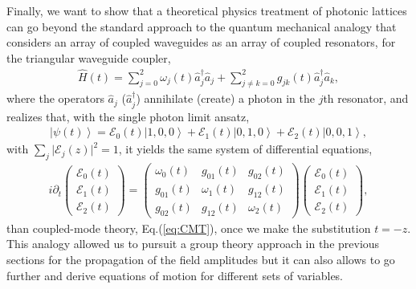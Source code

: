 \documentclass[9pt,twocolumn,twoside]{osajnl}
\begin{document}
Finally, we want to show that a theoretical physics treatment of photonic lattices can go beyond the standard approach to the quantum mechanical analogy that considers an array of coupled waveguides as an array of coupled resonators, for the triangular waveguide coupler,
\begin{eqnarray}\label{eq:qmHamiltonian}
	\hat{H}(t) = \sum_{j=0}^{2} \omega_j(t) \hat{a}^{\dagger}_j \hat{a}_{j} + \sum_{j\neq k=0}^{2} g_{jk}(t) \hat{a}^{\dagger}_j \hat{a}_k,
\end{eqnarray}
where the operators $\hat{a}_{j}$ ($\hat{a}_{j}^{\dagger}$) annihilate (create) a photon in the $j$th resonator, and realizes that, with the single photon limit ansatz,
\begin{eqnarray}\label{eq:sglPhoton}
	\left\vert \psi(t) \right\rangle = \mathcal{E}_{0}(t) \left\vert 1, 0, 0 \right\rangle  +
	\mathcal{E}_{1}(t) \left\vert 0,1,0 \right\rangle + \mathcal{E}_{2}(t) \left\vert 0,0,1 \right\rangle,
\end{eqnarray}
with $ \sum_{j} \vert \mathcal{E}_{j}(z) \vert^2 = 1$, it yields the same system of differential equations,
\begin{eqnarray} \label{eq:}
	i \partial_t	
	\left( \begin{array}{c} 
		\mathcal{E}_{0}(t) \\
		\mathcal{E}_{1}(t) \\
		\mathcal{E}_{2}(t)
	\end{array} \right) =
	\left( \begin{array}{ccc} 
		\omega_{0}(t)  & g_{01}(t) & g_{02}(t) \\
		g_{01}(t) & \omega_{1}(t) & g_{12}(t) \\
		g_{02}(t) & g_{12}(t) & \omega_{2}(t)
	\end{array} \right)
	\left( \begin{array}{c} 
		\mathcal{E}_{0}(t) \\
		\mathcal{E}_{1}(t) \\
		\mathcal{E}_{2}(t)
	\end{array} \right),
\end{eqnarray}
than coupled-mode theory, Eq.(\ref{eq:CMT}), once we make the substitution $t=-z$. 
This analogy allowed us to pursuit a group theory approach in the previous sections for the propagation of the field amplitudes but it can also allows to go further and derive equations of motion for different sets of variables.
\end{document}
